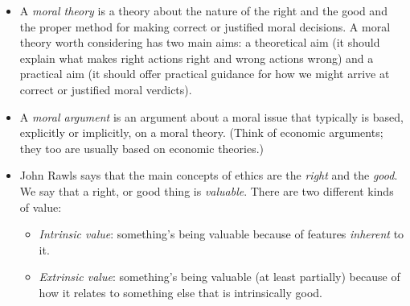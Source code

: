 \documentclass{article}
\begin{document}
\begin{spacing}{1.2}
\begin{itemize}
        \item A \emph{moral theory} is a theory about the nature of the right and the good and the proper method for making correct or justified moral decisions. A moral theory worth considering has two main aims: a theoretical aim (it should explain what makes right actions right and wrong actions wrong) and a practical aim (it should offer practical guidance for how we might arrive at correct or justified moral verdicts).
        \item A \emph{moral argument} is an argument about a moral issue
              that typically is based, explicitly or implicitly, on a moral
              theory. (Think of economic arguments; they too are usually
              based on economic theories.)
        \item John Rawls says that the main concepts of ethics are the \emph{right} and the \emph{good}. We say that a right, or good thing is \emph{valuable}. There are two different kinds of value:
              \begin{itemize}
                  \item \emph{Intrinsic value}: something's being valuable because of features \emph{inherent} to it.
                  \item \emph{Extrinsic value}: something's being valuable (at least partially) because of how it relates to something else that is intrinsically good.
              \end{itemize}
    \end{itemize}
\end{spacing}
\end{document}
